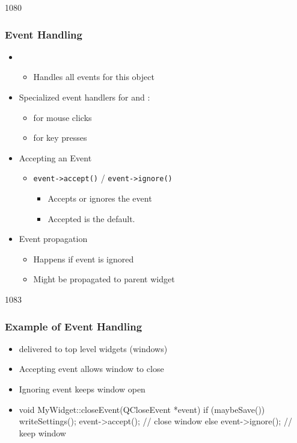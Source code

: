 \begin{slide}{1080}
\frametitle{Event Handling}

\begin{itemize}
\item {}
  \begin{itemize}
  \item Handles all events for this object
 \end{itemize}
\item Specialized event handlers for  and :
  \begin{itemize}
  \item {} for mouse clicks
  \item {} for key presses
 \end{itemize}\bigskip
\item Accepting an Event
  \begin{itemize}
  \item \lstinline{event->accept()} / \lstinline{event->ignore()}
    \begin{itemize}
    \item Accepts or ignores the event
    \item Accepted is the default.
    \end{itemize}
  \end{itemize}
\item Event propagation
  \begin{itemize}
  \item Happens if event is ignored
  \item Might be propagated to parent widget
  \end{itemize}
\end{itemize}
\end{slide}

\begin{slide}[fragile]{1083}
\frametitle{Example of Event Handling}

\begin{itemize}
\item {} delivered to top level widgets (windows)
\item Accepting event allows window to close
\item Ignoring event keeps window open
\item[]
\begin{cpp}
void MyWidget::closeEvent(QCloseEvent *event) {
  if (maybeSave()) {
    writeSettings();
    event->accept(); // close window
  } else {
    event->ignore(); // keep window
  }
}
\end{cpp}  
\end{itemize}
\end{slide}

